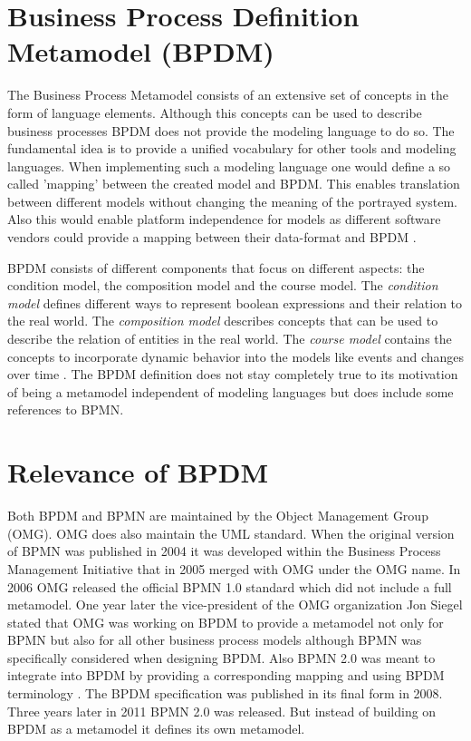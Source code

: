 \documentclass[a4paper,11pt]{article}
\begin{document}
\section{Business Process Definition Metamodel (BPDM)}
The Business Process Metamodel consists of an extensive set of concepts in the
form of language elements. Although this concepts can be used to describe
business processes BPDM does not provide the modeling language to do so. The
fundamental idea is to provide a unified voca\-bulary for other tools and
modeling languages. When implementing such a modeling language one would
define a so called 'mapping' between the created model and BPDM. This enables
translation between different models without changing the meaning of the
portrayed system. Also this would enable platform independence for models as
different software vendors could provide a mapping between their data-format
and BPDM \cite{omg-kol1}.

BPDM consists of different components that focus on different aspects: the
condition model, the composition model and the course model. The
\emph{condition model} defines different ways to represent boolean expressions
and their relation to the real world. The \emph{composition model} describes
concepts that can be used to describe the relation of entities in the real
world. The \emph{course model} contains the concepts to incorporate dynamic
behavior into the models like events and changes over time \cite{bpdm}. The
BPDM definition does not stay completely true to its motivation of being a
metamodel independent of modeling languages but does include some references
to BPMN.

\section{Relevance of BPDM}
Both BPDM and BPMN are maintained by the Object Management Group (OMG). OMG
does also maintain the UML standard. When the original version of BPMN was
published in 2004 it was developed within the Business Process Management
Initiative that in 2005 merged with OMG under the OMG name. In 2006 OMG
released the official BPMN 1.0 standard which did not include a full
metamodel. One year later the vice-president of the OMG organization Jon
Siegel stated that OMG was working on BPDM to provide a metamodel not only for
BPMN but also for all other business process models although BPMN was
specifically considered when designing BPDM. Also BPMN 2.0 was meant to
integrate into BPDM by providing a corresponding mapping and using BPDM
terminology \cite{omg-kol1}. The BPDM specification was published in its final
form in 2008. Three years later in 2011 BPMN 2.0 was released. But instead of
building on BPDM as a metamodel it defines its own metamodel.
\end{document}
